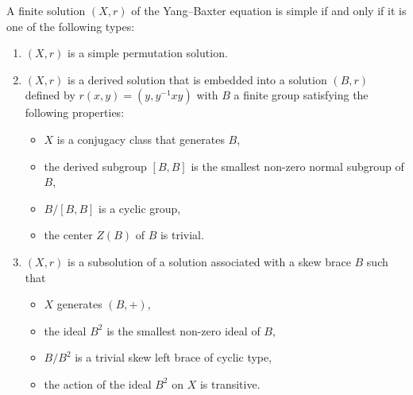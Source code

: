     \begin{theorem}
        A finite solution $(X,r)$ of the Yang--Baxter equation is simple if and only if
    it is one of the following types: 
    \begin{enumerate}
        \item $(X,r)$ is a simple permutation solution.
        \item $(X,r)$ is a derived solution that is embedded into a solution $(B,r)$ defined by $r(x,y)=(y, y^{-1}xy)$ with $B$ a finite group satisfying 
        the following properties:
        \begin{itemize}
            \item $X$ is a conjugacy class that generates $B$,
            \item the derived subgroup $[B,B]$ is the smallest non-zero normal subgroup of $B$,
            \item $B/[B,B]$ is a cyclic group,
            \item the center $Z(B)$ of $B$ is trivial.
        \end{itemize}
        \item $(X,r)$ is a subsolution of a solution associated with a skew  brace $B$ such that 
        \begin{itemize}
            \item $X$ generates $(B,+)$,
            \item the ideal $B^2$ is the smallest non-zero ideal of $B$,
            \item $B/B^2$ is a trivial skew left brace of cyclic type,
            \item the action of the ideal $B^2$ on $X$ is transitive.
        \end{itemize}
    \end{enumerate}
    \end{theorem}